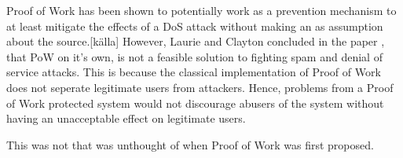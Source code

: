 Proof of Work has been shown to potentially work as a prevention mechanism to at least mitigate the effects of a DoS attack without making an as assumption about the source.[källa] However, Laurie and Clayton concluded in the paper , that PoW on it's own, is not a feasible solution to fighting spam and denial of service attacks. This is because the classical implementation of Proof of Work does not seperate legitimate users from attackers. Hence, problems from a Proof of Work protected system would not discourage abusers of the system without having an unacceptable effect on legitimate users. 

This was not that was unthought of when Proof of Work was first proposed. 